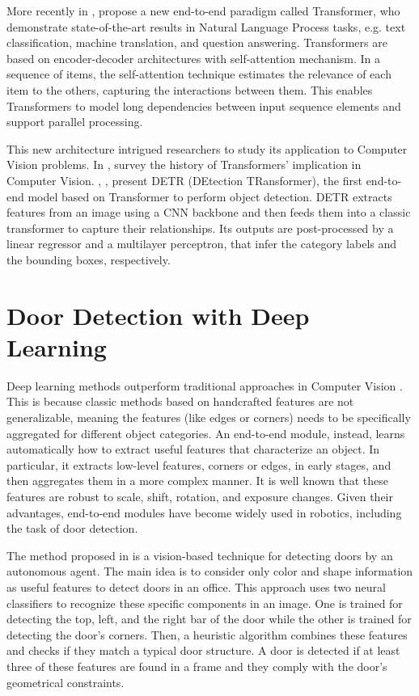  More recently in \cite{transformer}, \citeauthor{transformer} propose a new end-to-end paradigm called Transformer, who demonstrate state-of-the-art results in Natural Language Process tasks, e.g. text classification, machine translation, and question answering. Transformers are based on encoder-decoder architectures with self-attention mechanism. In a sequence of items, the self-attention technique estimates the relevance of each item to the others, capturing the interactions between them. This enables Transformers to model long dependencies between input sequence elements and support parallel processing. 
 
 This new architecture intrigued researchers to study its application to Computer Vision problems. In \cite{surveytransformer}, \citeauthor{surveytransformer} survey the history of Transformers' implication in Computer Vision. \citeauthor{detr}, \cite{detr}, present DETR (DEtection TRansformer), the first end-to-end model based on Transformer to perform object detection. DETR extracts features from an image using a CNN backbone and then feeds them into a classic transformer to capture their relationships. Its outputs are post-processed by a linear regressor and a multilayer perceptron, that infer the category labels and the bounding boxes, respectively.
 
 \section{Door Detection with Deep Learning} 
 Deep learning methods outperform traditional approaches in Computer Vision \cite{deeplearningoverview}. This is because classic methods based on handcrafted features are not generalizable, meaning the features (like edges or corners) needs to be specifically aggregated for different object categories. An end-to-end module, instead, learns automatically how to extract useful features that characterize an object. In particular, it extracts low-level features, corners or edges, in early stages, and then aggregates them in a more complex manner. It is well known that these features are robust to scale, shift, rotation, and exposure changes. Given their advantages, end-to-end modules have become widely used in robotics, including the task of door detection.
 
 The method proposed in \cite{detectdoorsfeature} is a vision-based technique for detecting doors by an autonomous agent. The main idea is to consider only color and shape information as useful features to detect doors in an office. This approach uses two neural classifiers to recognize these specific components in an image. One is trained for detecting the top, left, and the right bar of the door while the other is trained for detecting the door's corners. Then, a heuristic algorithm combines these features and checks if they match a typical door structure. A door is detected if at least three of these features are found in a frame and they comply with the door's geometrical constraints. 
 
